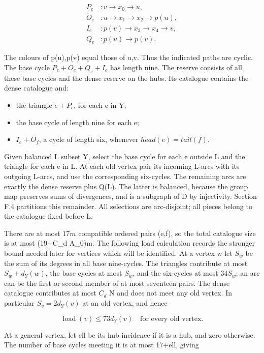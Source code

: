 \documentclass[english,11pt,a4paper]{article}
\providecommand{\tightlist}{\setlength{\itemsep}{0pt}\setlength{\parskip}{0pt}}
\begin{document}
\[\begin{aligned}P_e&:v\to x_0\to u,\\O_e&:u\to x_1\to x_2\to p(u),\\I_e&:p(v)\to x_3\to x_4\to v,\\Q_e&:p(u)\to p(v).\end{aligned}\]

The colours of p(u),p(v) equal those of u,v. Thus the indicated paths are cyclic. The base cycle \(P_{e}+O_{e}+Q_{e}+I_{e}\) has length nine. The reserve consists of all these base cycles and the dense reserve on the hubs. Its catalogue contains the dense catalogue and:

\begin{itemize}
\tightlist
\item
  the triangle \(e+P_{e}\), for each e in Y;
\item
  the base cycle of length nine for each e;
\item
  \(I_{e}+O_{f}\), a cycle of length six, whenever \(head(e)=tail(f)\).
\end{itemize}

Given balanced L subset Y, select the base cycle for each e outside L and the triangle for each e in L. At each old vertex pair its incoming L-arcs with its outgoing L-arcs, and use the corresponding six-cycles. The remaining arcs are exactly the dense reserve plus Q(L). The latter is balanced, because the group map preserves sums of divergences, and is a subgraph of D by injectivity. Section F.4 partitions this remainder. All selections are arc-disjoint; all pieces belong to the catalogue fixed before L.

There are at most \(17m\) compatible ordered pairs (e,f), so the total catalogue size is at most (19+C\_d A\_0)m. The following load calculation records the stronger bound needed later for vertices which will be identified. At a vertex w let \(S_{w}\) be the sum of its degrees in all base nine-cycles. The triangles contribute at most \(S_{w}+d_{Y}(w)\), the base cycles at most \(S_{w}\), and the six-cycles at most \(34S_{w}\): an arc can be the first or second member of at most seventeen pairs. The dense catalogue contributes at most \(C_{d}\) N and does not meet any old vertex. In particular \(S_{v}=2d_{Y}(v)\) at an old vertex, and hence

\[\operatorname{load}(v)\le73d_Y(v)\quad\text{for every old vertex}.\tag{F.9}\]

At a general vertex, let ell be its hub incidence if it is a hub, and zero otherwise. The number of base cycles meeting it is at most 17+ell, giving
\end{document}
